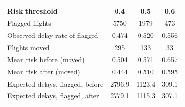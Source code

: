 \begin{tabular}{lccc}
\toprule
Risk threshold & 0.4 & 0.5 & 0.6 \\
\midrule
Flagged flights & 5750 & 1979 & 473 \\
Observed delay rate of flagged & 0.474 & 0.520 & 0.556 \\
Flights moved & 295 & 133 & 33 \\
Mean risk before (moved) & 0.504 & 0.571 & 0.657 \\
Mean risk after (moved) & 0.444 & 0.510 & 0.595 \\
Expected delays, flagged, before & 2796.9 & 1123.4 & 309.1 \\
Expected delays, flagged, after & 2779.1 & 1115.3 & 307.1 \\
\bottomrule
\end{tabular}
